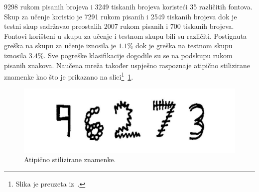 9298 rukom pisanih brojeva i 3249 tiskanih brojeva koristeći 35 različitih fontova. Skup za učenje koristio je 7291
rukom pisanih i 2549 tiskanih brojeva dok je testni skup sadržavao preostalih 2007 rukom pisanih i 700 tiskanih brojeva.
Fontovi korišteni u skupu za učenje i testnom skupu bili su različiti. Postignuta greška na skupu za učenje iznosila je
$1.1\%$ dok je greška na testnom skupu iznosila $3.4\%$. Sve pogreške klasifikacije dogodile su se na podskupu rukom
pisanih znakova. Naučena mreža također uspješno raspoznaje atipično stilizirane znamenke kao što je prikazano na
slici\footnote{Slika je preuzeta iz\ \citep{leCun1990}.}\ \ref{fig:atipicno-stilizirane-znamenke}.
\begin{figure}[htb]
    \centering
    \includegraphics[width=12cm]{images/chapter2/atypical-data.png}
    \caption{Atipično stilizirane znamenke.}
    \label{fig:atipicno-stilizirane-znamenke}
\end{figure}

